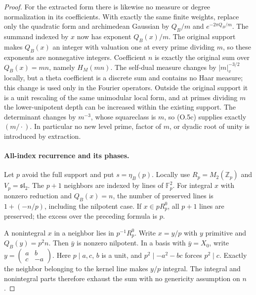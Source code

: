 \documentclass[11pt]{article}
\theoremstyle{definition}
\theoremstyle{remark}
\begin{document}
\begin{proof}
For the extracted form there is likewise no measure or degree
normalization in its coefficients. With exactly the same finite
weights, replace only the quadratic form and archimedean Gaussian
by $Q_B/m$ and $e^{-2\pi Q_B/m}$. The summand indexed by $x$ now
has exponent $Q_B(x)/m$. The original support makes $Q_B(x)$ an
integer with valuation one at every prime dividing $m$, so these
exponents are nonnegative integers. Coefficient $n$ is exactly
the original sum over $Q_B(x)=mn$, namely $H_M(mn)$.
The self-dual measure changes by $|m|_v^{-3/2}$ locally, but a
theta coefficient is a discrete sum and contains no Haar
measure; this change is used only in the Fourier operators.
Outside the original support it is a unit rescaling of the same
unimodular local form, and at primes dividing $m$ the
lower-unipotent depth can be increased within the existing
support. The determinant changes by $m^{-3}$, whose squareclass
is $m$, so (O.5c) supplies exactly $(m/\cdot)$.
In particular no new level prime, factor of $m$, or dyadic
root of unity is introduced by extraction.


\paragraph{All-index recurrence and its phases.}
Let $p$ avoid the full support and put $s=\eta_B(p)$.
Locally use $R_p=M_2(\mathbb Z_p)$ and $V_p=\mathfrak{sl}_2$.
The $p+1$ neighbors are indexed by lines of $\mathbb F_p^2$.
For integral $x$ with nonzero reduction and $Q_B(x)=n$, the number
of preserved lines is $1+(-n/p)$, including the nilpotent case.
If $x\in pR_p^0$, all $p+1$ lines are preserved; the excess
over the preceding formula is $p$.

A nonintegral $x$ in a neighbor lies in $p^{-1}R_p^0$.
Write $x=y/p$ with $y$ primitive and $Q_B(y)=p^2n$.
Then $\bar y$ is nonzero nilpotent.  In a basis with
$\bar y=X_0$, write
$y=\left(\begin{smallmatrix}a&b\\c&-a\end{smallmatrix}\right)$.
Here $p\mid a,c$, $b$ is a unit, and
$p^2\mid-a^2-bc$ forces $p^2\mid c$.  Exactly the neighbor
belonging to the kernel line makes $y/p$ integral.  The integral
and nonintegral parts therefore exhaust the sum with no genericity
assumption on $n$.


\end{proof}
\end{document}
